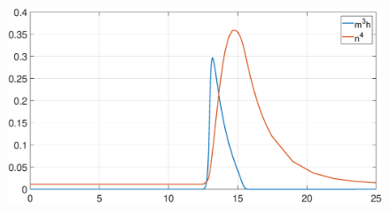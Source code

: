 \documentclass[12pt,a4paper]{article}
\begin{document}
\begin{CJK}{UTF8}{bsmi}
\begin{enumerate}
\begin{figure}[htbp]
			\end{figure}
			\begin{figure}[htbp]
				\centering
				\includegraphics[width = 500pt]{gate2.eps}
			\end{figure}
		\end{enumerate}
	\end{CJK}
\end{document}
